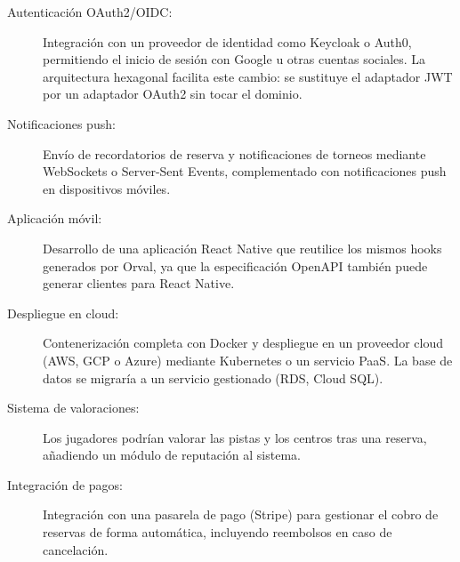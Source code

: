 \begin{description}
  \item[Autenticación OAuth2/OIDC:] Integración con un proveedor de identidad
    como Keycloak o Auth0, permitiendo el inicio de sesión con Google u otras
    cuentas sociales. La arquitectura hexagonal facilita este cambio: se sustituye
    el adaptador JWT por un adaptador OAuth2 sin tocar el dominio.

  \item[Notificaciones push:] Envío de recordatorios de reserva y notificaciones
    de torneos mediante WebSockets o Server-Sent Events, complementado con
    notificaciones push en dispositivos móviles.

  \item[Aplicación móvil:] Desarrollo de una aplicación React Native que reutilice
    los mismos hooks generados por Orval, ya que la especificación OpenAPI también
    puede generar clientes para React Native.

  \item[Despliegue en cloud:] Contenerización completa con Docker y despliegue
    en un proveedor cloud (AWS, GCP o Azure) mediante Kubernetes o un servicio
    PaaS. La base de datos se migraría a un servicio gestionado (RDS, Cloud SQL).

  \item[Sistema de valoraciones:] Los jugadores podrían valorar las pistas y los
    centros tras una reserva, añadiendo un módulo de reputación al sistema.

  \item[Integración de pagos:] Integración con una pasarela de pago (Stripe) para
    gestionar el cobro de reservas de forma automática, incluyendo reembolsos
    en caso de cancelación.
\end{description}
